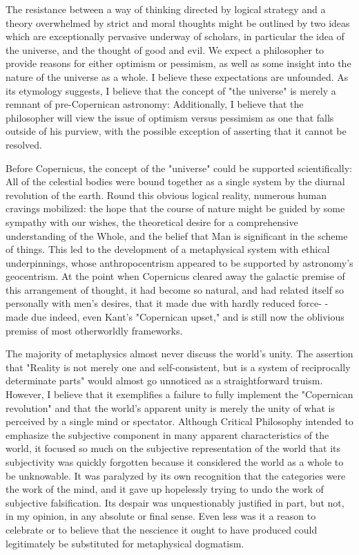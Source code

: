 \documentclass[a4paper,12pt]{book}[2004/02/16]
\theoremstyle{ilemma}
\theoremstyle{itheorem}
\theoremstyle{iother}
\theoremstyle{icorollary}
\theoremstyle{numcorollary}
\theoremstyle{idefinition}
\begin{document}
The resistance between a way of thinking directed by logical strategy and a
theory overwhelmed by strict and moral thoughts might be outlined
by two ideas which are exceptionally pervasive underway of scholars,
in particular the idea of the universe, and the thought of good and
evil. We expect a philosopher to provide reasons for either optimism or pessimism, as well as some insight into the nature of the universe as a whole. I believe these expectations are unfounded. As its etymology suggests, I believe that the concept of "the universe" is merely a remnant of pre-Copernican astronomy: Additionally, I believe that the philosopher will view the issue of optimism versus pessimism as one that falls outside of his purview, with the possible exception of asserting that it cannot be resolved.

Before Copernicus, the concept of the "universe" could be supported scientifically: All of the celestial bodies were bound together as a single system by the diurnal revolution of the earth. Round this obvious logical reality,
numerous human cravings mobilized: the hope that the course of nature might be guided by some sympathy with our wishes, the theoretical desire for a comprehensive understanding of the Whole, and the belief that Man is significant in the scheme of things. This led to the development of a metaphysical system with ethical underpinnings, whose anthropocentrism appeared to be supported by astronomy's geocentrism. At the point when Copernicus
cleared away the galactic premise of this arrangement of thought, it had
become so natural, and had related itself so personally with men's
desires, that it made due with hardly reduced force- - made due
indeed, even Kant's "Copernican upset," and is still now the oblivious
premiss of most otherworldly frameworks.

The majority of metaphysics almost never discuss the world's unity. The assertion that "Reality is not merely one and self-consistent, but is a system of reciprocally determinate parts" would almost go unnoticed as a straightforward truism. However, I believe that it exemplifies a failure to fully implement the "Copernican revolution" and that the world's apparent unity is merely the unity of what is perceived by a single mind or spectator. Although Critical Philosophy intended to emphasize the subjective component in many apparent characteristics of the world, it focused so much on the subjective representation of the world that its subjectivity was quickly forgotten because it considered the world as a whole to be unknowable. It was paralyzed by its own recognition that the categories were the work of the mind, and it gave up hopelessly trying to undo the work of subjective falsification. Its despair was unquestionably justified in part, but not, in my opinion, in any absolute or final sense. Even less was it a reason to celebrate or to believe that the nescience it ought to have produced could legitimately be substituted for metaphysical dogmatism.
\end{document}
